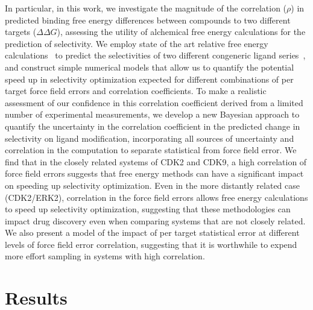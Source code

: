 \documentclass[phd,tocprelim]{cornell}
\begin{document}
In particular, in this work, we investigate the magnitude of the correlation ($\rho$) in predicted binding free energy differences between compounds to two different targets ($\Delta \Delta G$), assessing the utility of alchemical free energy calculations for the prediction of selectivity. 
We employ state of the art relative free energy calculations~\citep{Wang:J.Am.Chem.Soc.:2015,Abel:2017jt} to predict the selectivities of two different congeneric ligand series~\citep{Shao2013-oe, Blake2016-su}, and construct simple numerical models that allow us to quantify the potential speed up in selectivity optimization expected for different combinations of per target force field errors and correlation coefficients. 
To make a realistic assessment of our confidence in this correlation coefficient derived from a limited number of experimental measurements, we develop a new Bayesian approach to quantify the uncertainty in the correlation coefficient in the predicted change in selectivity on ligand modification, incorporating all sources of uncertainty and correlation in the computation to separate statistical from force field error. 
We find that in the closely related systems of CDK2 and CDK9, a high correlation of force field errors suggests that free energy methods can have a significant impact on speeding up selectivity optimization. 
Even in the more distantly related case (CDK2/ERK2), correlation in the force field errors allows free energy calculations to speed up selectivity optimization, suggesting that these methodologies can impact drug discovery even when comparing systems that are not closely related. 
We also present a model of the impact of per target statistical error at different levels of force field error correlation, suggesting that it is worthwhile to expend more effort sampling in systems with high correlation.




\section{Results}
\end{document}
